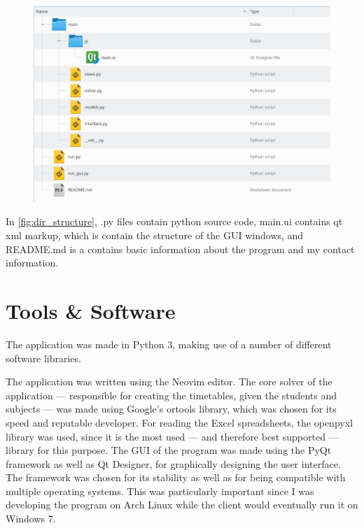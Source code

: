 \documentclass[12pt]{article}
\begin{document}
\begin{figure}[H]
    \label{fig:dir_structure}
    \includegraphics[width=\textwidth]{directory_structure}
\end{figure}

In \autoref{fig:dir_structure}, .py files contain python source code, main.ui contains qt
xml markup, which is contain the structure of the GUI windows, and README.md is a contains
basic information about the program and my contact information.

\section{Tools \& Software}

The application was made in Python 3, making use of a number of different software
libraries.  

The application was written using the Neovim \autocite{neovim} editor. The core solver of
the application --- responsible for creating the timetables, given the students and subjects
--- was made using Google's ortools \autocite{ortools} library, which was chosen for its
speed and reputable developer.  For reading the Excel spreadsheets, the
openpyxl\autocite{openpyxl} library was used, since it is the most used --- and therefore
best supported --- library for this purpose. The GUI of the program was made using the PyQt
framework as well as Qt Designer, for graphically designing the user interface. The
framework was chosen for its stability as well as for being compatible with multiple
operating systems. This was particularly important since I was developing the program on
Arch Linux while the client would eventually run it on Windows 7.
\end{document}
